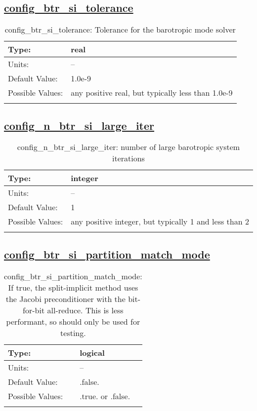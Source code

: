 \subsection[config\_btr\_si\_tolerance]{\hyperref[sec:nm_tab_split_implicit_ts]{config\_btr\_si\_tolerance}}
\label{subsec:nm_sec_config_btr_si_tolerance}
\begin{center}
\begin{longtable}{| p{2.0in} || p{4.0in} |}
    \hline
    Type: & real \\
    \hline
    Units: & -- \\
    \hline
    Default Value: & 1.0e-9 \\
    \hline
    Possible Values: & any positive real, but typically less than 1.0e-9 \\
    \hline
    \caption{config\_btr\_si\_tolerance: Tolerance for the barotropic mode solver}
\end{longtable}
\end{center}
\subsection[config\_n\_btr\_si\_large\_iter]{\hyperref[sec:nm_tab_split_implicit_ts]{config\_n\_btr\_si\_large\_iter}}
\label{subsec:nm_sec_config_n_btr_si_large_iter}
\begin{center}
\begin{longtable}{| p{2.0in} || p{4.0in} |}
    \hline
    Type: & integer \\
    \hline
    Units: & -- \\
    \hline
    Default Value: & 1 \\
    \hline
    Possible Values: & any positive integer, but typically 1 and less than 2 \\
    \hline
    \caption{config\_n\_btr\_si\_large\_iter: number of large barotropic system iterations}
\end{longtable}
\end{center}
\subsection[config\_btr\_si\_partition\_match\_mode]{\hyperref[sec:nm_tab_split_implicit_ts]{config\_btr\_si\_partition\_match\_mode}}
\label{subsec:nm_sec_config_btr_si_partition_match_mode}
\begin{center}
\begin{longtable}{| p{2.0in} || p{4.0in} |}
    \hline
    Type: & logical \\
    \hline
    Units: & -- \\
    \hline
    Default Value: & .false. \\
    \hline
    Possible Values: & .true. or .false. \\
    \hline
    \caption{config\_btr\_si\_partition\_match\_mode: If true, the split-implicit method uses the Jacobi preconditioner with the bit-for-bit all-reduce. This is less performant, so should only be used for testing.}
\end{longtable}
\end{center}

